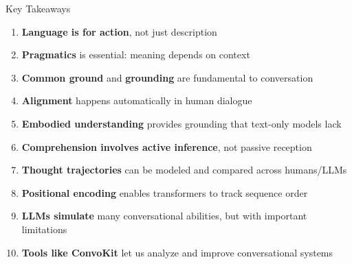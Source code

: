 \documentclass[aspectratio=169]{beamer}
\begin{document}
\begin{frame}[shrink=10]{Key Takeaways 🔑}
    \begin{enumerate}\setlength{\itemsep}{0pt}
        \item \textbf{Language is for action}, not just description

        \item \textbf{Pragmatics} is essential: meaning depends on context

        \item \textbf{Common ground} and \textbf{grounding} are fundamental to conversation

        \item \textbf{Alignment} happens automatically in human dialogue

        \item \textbf{Embodied understanding} provides grounding that text-only models lack

        \item \textbf{Comprehension involves active inference}, not passive reception

        \item \textbf{Thought trajectories} can be modeled and compared across humans/LLMs

        \item \textbf{Positional encoding} enables transformers to track sequence order

        \item \textbf{LLMs simulate} many conversational abilities, but with important limitations

        \item \textbf{Tools like ConvoKit} let us analyze and improve conversational systems
    \end{enumerate}
\end{frame}
\end{document}
